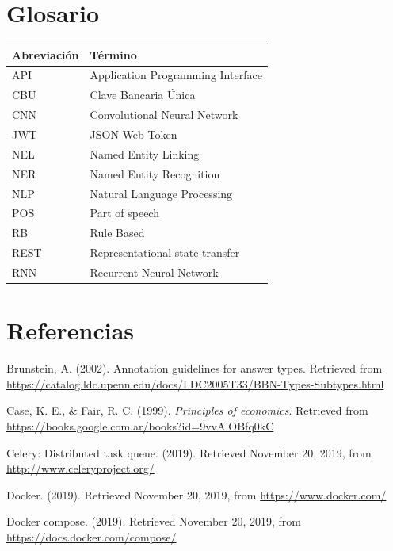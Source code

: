 \documentclass[12pt,a4paper,]{scrartcl}
\begin{document}
\newpage

\hypertarget{glosario}{%
\section*{Glosario}\label{glosario}}

\begin{tabular}{ll}
\toprule
Abreviación & Término\\
\midrule
API & Application Programming Interface\\
CBU & Clave Bancaria Única\\
CNN & Convolutional Neural Network\\
JWT & JSON Web Token\\
NEL & Named Entity Linking\\
\addlinespace
NER & Named Entity Recognition\\
NLP & Natural Language Processing\\
POS & Part of speech\\
RB & Rule Based\\
REST & Representational state transfer\\
\addlinespace
RNN & Recurrent Neural Network\\
\bottomrule
\end{tabular}

\hypertarget{referencias}{%
\section*{Referencias}\label{referencias}}

\hypertarget{refs}{}
\leavevmode\hypertarget{ref-brunstein2002}{}%
Brunstein, A. (2002). Annotation guidelines for answer types. Retrieved from \url{https://catalog.ldc.upenn.edu/docs/LDC2005T33/BBN-Types-Subtypes.html}

\leavevmode\hypertarget{ref-lawOfDiminishingReturns}{}%
Case, K. E., \& Fair, R. C. (1999). \emph{Principles of economics}. Retrieved from \url{https://books.google.com.ar/books?id=9vvAlOBfq0kC}

\leavevmode\hypertarget{ref-celery}{}%
Celery: Distributed task queue. (2019). Retrieved November 20, 2019, from \url{http://www.celeryproject.org/}

\leavevmode\hypertarget{ref-docker}{}%
Docker. (2019). Retrieved November 20, 2019, from \url{https://www.docker.com/}

\leavevmode\hypertarget{ref-dockercompose}{}%
Docker compose. (2019). Retrieved November 20, 2019, from \url{https://docs.docker.com/compose/}
\end{document}
